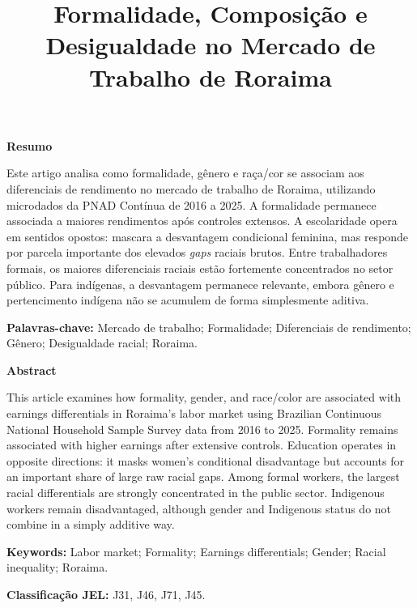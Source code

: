 \documentclass[12pt]{article}
\title{Formalidade, Composição e Desigualdade no Mercado de Trabalho de Roraima}
\date{}
\begin{document}
\maketitle
\thispagestyle{empty}

\begin{center}
\begin{minipage}{0.85\textwidth}
    \small
\singlespacing
\textbf{Resumo}
\vspace{0.2cm}

Este artigo analisa como formalidade, gênero e raça/cor se associam aos
diferenciais de rendimento no mercado de trabalho de Roraima, utilizando
microdados da PNAD Contínua de 2016 a 2025. A formalidade permanece associada
a maiores rendimentos após controles extensos. A escolaridade opera em sentidos
opostos: mascara a desvantagem condicional feminina, mas responde por parcela
importante dos elevados \textit{gaps} raciais brutos. Entre trabalhadores formais, os
maiores diferenciais raciais estão fortemente concentrados no setor público.
Para indígenas, a desvantagem permanece relevante, embora gênero e pertencimento
indígena não se acumulem de forma simplesmente aditiva.

\smallskip
\textbf{Palavras-chave:} Mercado de trabalho; Formalidade; Diferenciais de rendimento; 
Gênero; Desigualdade racial; Roraima.

\bigskip

\textbf{Abstract}
\vspace{0.2cm}

This article examines how formality, gender, and race/color are associated
with earnings differentials in Roraima's labor market using Brazilian
Continuous National Household Sample Survey data from 2016 to 2025.
Formality remains associated with higher earnings after extensive controls.
Education operates in opposite directions: it masks women's conditional
disadvantage but accounts for an important share of large raw racial gaps.
Among formal workers, the largest racial differentials are strongly
concentrated in the public sector. Indigenous workers remain disadvantaged,
although gender and Indigenous status do not combine in a simply additive way.

\smallskip
\textbf{Keywords:} Labor market; Formality; Earnings differentials; Gender; Racial inequality; 
Roraima.

\bigskip
\textbf{Classificação JEL:} J31, J46, J71, J45.
\end{minipage}
\end{center}
\end{document}
